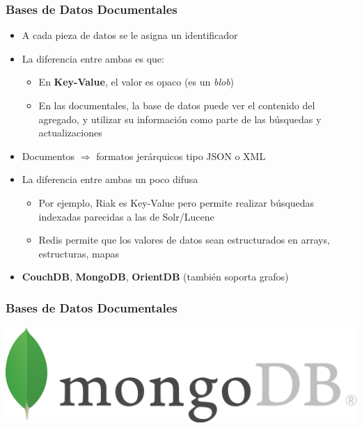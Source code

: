 \documentclass[14pt]{beamer}
\begin{document}
\begin{frame}[allowframebreaks]
  \frametitle{Bases de Datos Documentales}
\vspace*{-.9em}
\begin{itemize}
\item A cada pieza de datos se le asigna un identificador
\item La diferencia entre ambas es que:
  \begin{itemize}
  \item En {\bf Key-Value}, el valor es opaco (es un {\em blob\/})
  \item En las documentales, la base de datos puede ver el contenido del
    agregado, y utilizar su información como parte de las búsquedas y
    actualizaciones
\end{itemize}
\item Documentos $\Rightarrow$ formatos jerárquicos tipo JSON o XML
\framebreak
\item La diferencia entre ambas un poco difusa
  \begin{itemize}
  \item Por ejemplo, Riak es Key-Value pero permite realizar búsquedas
    indexadas parecidas a las de Solr/Lucene
\item Redis permite que los valores de datos sean estructurados en arrays,
  estructuras, mapas
  \end{itemize}
\item {\bf CouchDB}, {\bf MongoDB}, {\bf OrientDB} (también soporta grafos)
\end{itemize}
\end{frame}

\begin{frame}
  \frametitle{Bases de Datos Documentales}
  \includegraphics[width=\textwidth]{img/MongoDB}
\end{frame}
\end{document}
